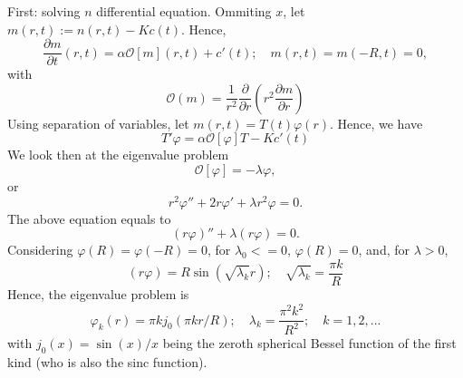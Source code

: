 \documentclass[]{article}
\newcommand{\pderiv}[2]{\frac{\partial #1}{\partial #2}}
\begin{document}
First: solving $n$ differential equation. Ommiting $x$, let $m(r,t) := n(r,t) - K c(t)$. Hence,
\begin{equation}\label{precipitatemproblem}
	\pderiv{m}{t}(r,t) = \alpha \mathcal{O}[m](r,t) + c'(t); \quad m(r,t) = m(-R,t) = 0,
\end{equation}
with
\begin{equation}
	\mathcal{O}(m) = \frac{1}{r^2} \pderiv{}{r} \left( r^2 \pderiv{m}{r} \right)
\end{equation}
Using separation of variables, let $m(r,t) = T(t) \varphi(r)$. Hence, we have
\begin{equation}
 T' \varphi = \alpha \mathcal{O}[\varphi] T - K c'(t)
\end{equation}
We look then at the eigenvalue problem
\begin{equation}
\mathcal{O}[\varphi] = -\lambda \varphi,
\end{equation}
or
\begin{equation}
r^2 \varphi'' + 2 r \varphi' + \lambda r^2 \varphi = 0.
\end{equation}
The above equation equals to
\begin{equation}
(r \varphi)'' + \lambda (r \varphi) = 0.
\end{equation}
Considering $\varphi(R) = \varphi(-R) = 0$, for $\lambda_0 <= 0$, $\varphi(R) = 0$, and, for $\lambda > 0$,
\begin{equation}
(r \varphi) = R \sin (\sqrt{\lambda_k} r); \quad \sqrt{\lambda_k} = \frac{\pi k}{R}
\end{equation}
Hence, the eigenvalue problem is 
\begin{equation}\label{eigenvaluemproblem}
\varphi_k(r) = \pi k j_0(\pi k r/R); \quad \lambda_k = \frac{\pi^2 k^2}{R^2}; \quad k = 1, 2, ...
\end{equation}
with $j_0(x) = \sin(x)/x$ being the zeroth spherical Bessel function of the first kind (who is also the sinc function).
\end{document}
